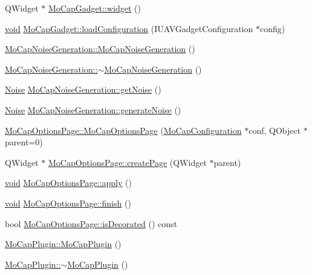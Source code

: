 \begin{DoxyCompactItemize}
\item 
\-Q\-Widget $\ast$ \hyperlink{group___mo_cap_plugin_ga10e2501808e097eccf87a35bc8111c20}{\-Mo\-Cap\-Gadget\-::widget} ()
\item 
\hyperlink{group___u_a_v_objects_plugin_ga444cf2ff3f0ecbe028adce838d373f5c}{void} \hyperlink{group___mo_cap_plugin_ga3ec1dcb97187294b0436fd7a0e5532d1}{\-Mo\-Cap\-Gadget\-::load\-Configuration} (\-I\-U\-A\-V\-Gadget\-Configuration $\ast$config)
\item 
\hyperlink{group___mo_cap_plugin_ga8157e4474b5a83adb73bbf40aa9f5fe6}{\-Mo\-Cap\-Noise\-Generation\-::\-Mo\-Cap\-Noise\-Generation} ()
\item 
\hyperlink{group___mo_cap_plugin_ga8881b0089bfba1918a16456398fabb55}{\-Mo\-Cap\-Noise\-Generation\-::$\sim$\-Mo\-Cap\-Noise\-Generation} ()
\item 
\hyperlink{struct_noise}{\-Noise} \hyperlink{group___mo_cap_plugin_ga0fe5a906dcd6c5d3dd92267217fdb9ef}{\-Mo\-Cap\-Noise\-Generation\-::get\-Noise} ()
\item 
\hyperlink{struct_noise}{\-Noise} \hyperlink{group___mo_cap_plugin_gab39e02794679a919f0d20b1901ec28c4}{\-Mo\-Cap\-Noise\-Generation\-::generate\-Noise} ()
\item 
\hyperlink{group___mo_cap_plugin_gaab2f4270ddf74e0e284cf1ea61d646c8}{\-Mo\-Cap\-Options\-Page\-::\-Mo\-Cap\-Options\-Page} (\hyperlink{class_mo_cap_configuration}{\-Mo\-Cap\-Configuration} $\ast$conf, \-Q\-Object $\ast$parent=0)
\item 
\-Q\-Widget $\ast$ \hyperlink{group___mo_cap_plugin_gab507e9ec6cd64d26e3034dcf753885ad}{\-Mo\-Cap\-Options\-Page\-::create\-Page} (\-Q\-Widget $\ast$parent)
\item 
\hyperlink{group___u_a_v_objects_plugin_ga444cf2ff3f0ecbe028adce838d373f5c}{void} \hyperlink{group___mo_cap_plugin_gaa5c95a0fa9de269561e8adb51407862a}{\-Mo\-Cap\-Options\-Page\-::apply} ()
\item 
\hyperlink{group___u_a_v_objects_plugin_ga444cf2ff3f0ecbe028adce838d373f5c}{void} \hyperlink{group___mo_cap_plugin_ga00ac715fe603d78584cf772904147f38}{\-Mo\-Cap\-Options\-Page\-::finish} ()
\item 
bool \hyperlink{group___mo_cap_plugin_gaea29fdd6e8a640f92167d6a581d23eac}{\-Mo\-Cap\-Options\-Page\-::is\-Decorated} () const 
\item 
\hyperlink{group___mo_cap_plugin_gae4dfd9a9bb3746b1311deb0968382442}{\-Mo\-Cap\-Plugin\-::\-Mo\-Cap\-Plugin} ()
\item 
\hyperlink{group___mo_cap_plugin_gae35a57590fd1156a31b514641702fb0e}{\-Mo\-Cap\-Plugin\-::$\sim$\-Mo\-Cap\-Plugin} ()

\end{DoxyCompactItemize}
